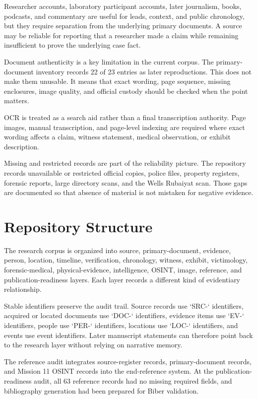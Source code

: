 Researcher accounts, laboratory participant accounts, later journalism, books, podcasts, and commentary are useful for leads, context, and public chronology, but they require separation from the underlying primary documents. A source may be reliable for reporting that a researcher made a claim while remaining insufficient to prove the underlying case fact.

Document authenticity is a key limitation in the current corpus. The primary-document inventory records 22 of 23 entries as later reproductions. This does not make them unusable. It means that exact wording, page sequence, missing enclosures, image quality, and official custody should be checked when the point matters.

OCR is treated as a search aid rather than a final transcription authority. Page images, manual transcription, and page-level indexing are required where exact wording affects a claim, witness statement, medical observation, or exhibit description.

Missing and restricted records are part of the reliability picture. The repository records unavailable or restricted official copies, police files, property registers, forensic reports, large directory scans, and the Wells Rubaiyat scan. Those gaps are documented so that absence of material is not mistaken for negative evidence.

\section{Repository Structure}

The research corpus is organized into source, primary-document, evidence, person, location, timeline, verification, chronology, witness, exhibit, victimology, forensic-medical, physical-evidence, intelligence, OSINT, image, reference, and publication-readiness layers. Each layer records a different kind of evidentiary relationship.

Stable identifiers preserve the audit trail. Source records use `SRC-` identifiers, acquired or located documents use `DOC-` identifiers, evidence items use `EV-` identifiers, people use `PER-` identifiers, locations use `LOC-` identifiers, and events use event identifiers. Later manuscript statements can therefore point back to the research layer without relying on narrative memory.

The reference audit integrates source-register records, primary-document records, and Mission 11 OSINT records into the end-reference system. At the publication-readiness audit, all 63 reference records had no missing required fields, and bibliography generation had been prepared for Biber validation.

